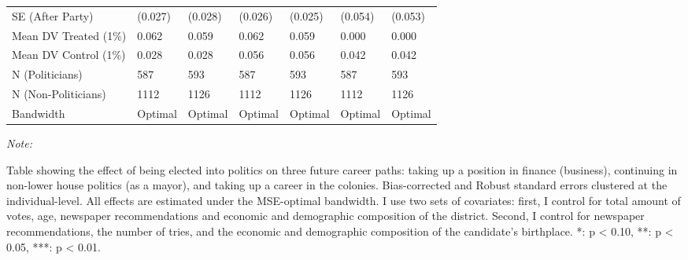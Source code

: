 \begin{table}[!h]
{\begin{threeparttable}
\begin{tabular}[t]{lllllll}
\hspace{1em}SE (After Party) & (0.027) & (0.028) & (0.026) & (0.025) & (0.054) & (0.053)\\
\hspace{1em}Mean DV Treated (1\%) & 0.062 & 0.059 & 0.062 & 0.059 & 0.000 & 0.000\\
\hspace{1em}Mean DV Control (1\%) & 0.028 & 0.028 & 0.056 & 0.056 & 0.042 & 0.042\\
\hspace{1em}N (Politicians) & 587 & 593 & 587 & 593 & 587 & 593\\
\hspace{1em}N (Non-Politicians) & 1112 & 1126 & 1112 & 1126 & 1112 & 1126\\
\hspace{1em}Bandwidth & Optimal & Optimal & Optimal & Optimal & Optimal & Optimal\\
\bottomrule
\end{tabular}
\begin{tablenotes}[para]
\item \textit{Note: } 
\item Table showing the effect of being elected into politics on three future career paths: taking up a position in finance (business), continuing in non-lower house politics (as a mayor), and taking up a career in the colonies. Bias-corrected and Robust standard errors clustered at the individual-level. All effects are estimated under the MSE-optimal bandwidth. I use two sets of covariates: first, I control for total amount of votes, age, newspaper recommendations and economic and demographic composition of the district. Second, I control for newspaper recommendations, the number of tries, and the economic and demographic composition of the candidate's birthplace. *: p < 0.10, **: p < 0.05, ***: p < 0.01.
\end{tablenotes}
\end{threeparttable}}
\end{table}
